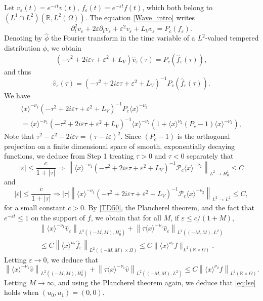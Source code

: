 \documentclass[10pt,leqno]{amsart}
\theoremstyle{definition}%
\theoremstyle{remark}
\numberwithin{equation}{section}
\newcommand{\R}{\mathbb{R}}
\def\eps{\varepsilon}
\renewcommand{\^}{\widehat}%
\newcommand{\la}{\langle}
\newcommand{\ra}{\rangle}
\newcommand{\PPP}{\mathcal{P}}
\begin{document}
	Let $v_{\eps}(t)=e^{-\eps t} v(t)$, $f_{\eps}(t)=e^{-\eps t} f(t)$, which both belong to $(L^1\cap L^2)(\R,L^2(\Omega))$. The equation \eqref{Wave_intro} writes
	$$ \partial_t^2v_{\eps}+2\eps\partial_tv_{\eps} +\eps^2v_{\eps}+L_Vv_{\eps}=P_c(f_{\eps}).$$
	Denoting by $\widehat{\phi}$ the Fourier transform in the time variable of a $L^2$-valued tempered distribution $\phi$, we obtain
	$$ \left(-\tau^2+2 i\eps\tau+\eps^2+L_V\right)\widehat{v}_{\eps}(\tau)=P_c\left( \widehat{f}_{\eps}(\tau) \right),$$
	and thus 
	\begin{equation}
	\label{TD50}
	\widehat{v}_{\eps}(\tau)=\left(-\tau^2+2 i\eps\tau+\eps^2+L_V\right)^{-1} P_c\left( \widehat{f}_{\eps}(\tau) \right).
	\end{equation} 
	We have 
	\begin{multline*}
	\la x\ra^{-\nu_1}\left( -\tau^2+2 i\eps\tau+\eps^2+L_V\right)^{-1} P_c \la x\ra^{-\nu_2}\\
	=\la x\ra^{-\nu_1}\left(  -\tau^2+2 i\eps\tau+\eps^2+L_V  \right)^{-1} \la x\ra^{-\nu_2}\left( 1+\la x\ra^{\nu_2}\left( P_c-1 \right)\la x\ra^{-\nu_2} \right),
	\end{multline*}
	Note that $\tau^2-\eps^2-2i\eps \tau=(\tau-i\eps)^2$.
	Since $(P_c-1)$ is the orthogonal projection on a finite dimensional space of smooth, exponentially decaying functions, we deduce from Step 1 treating $\tau>0$ and $\tau <0$ separately that 
	$$ |\eps|\leq \frac{c}{1+|\tau|}\Longrightarrow \left\|\la x\ra^{-\nu_1}\left(-\tau^2+2 i\eps\tau+\eps^2+L_V  \right)^{-1} \PPP_c \la x\ra^{-\nu_2}\right\|_{L^2\to H^1_0} \leq C$$
	and
	$$ |\eps|\leq \frac{c}{1+|\tau|}\Longrightarrow |\tau|\left\|\la x\ra^{-\nu_1}\left(-\tau^2+2 i\eps\tau+\eps^2+L_V  \right)^{-1} \PPP_c \la x\ra^{-\nu_2}\right\|_{L^2\to L^2} \leq C,$$
	for a small constant $c>0$.
	By \eqref{TD50}, the Plancherel theorem, and the fact that $e^{-\eps t}\leq 1$ on the support of $f$, we obtain that for all $M$, if $\eps\leq c/(1+M)$, 
	\begin{multline*}
	\left\| \la x\ra^{-\nu_1} \widehat{v}_{\eps} \right\|_{L^2\left( (-M,M),H^1_0\right)}+\left\| \tau \la x\ra^{-\nu_1} \widehat{v}_{\eps} \right\|_{L^2\left( (-M,M),L^2\right)}\\
	\leq C\left\|\la x\ra^{\nu_2}\widehat{f}_{\eps}\right\|_{L^2\left((-M,M)\times \Omega \right)}\leq C\|\la x\ra^{\nu_2}f\|_{L^2(\R\times \Omega)}.		 
	\end{multline*}
	Letting $\eps\to 0$, we deduce that 
	$$\left\| \la x\ra^{-\nu_1} \widehat{v} \right\|_{L^2\left( (-M,M),H^1_0\right)}+\left\| \tau \la x\ra^{-\nu_1} \widehat{v}\right\|_{L^2\left( (-M,M),L^2\right)}\leq C\left\|\la x\ra^{\nu_2}f\right\|_{L^2(\R\times \Omega)}.$$
	Letting $M\to\infty$, and using the Plancherel theorem again, we deduce that \eqref{eq:lse} holds when $(u_0,u_1)=(0,0)$.
	
\end{document}
